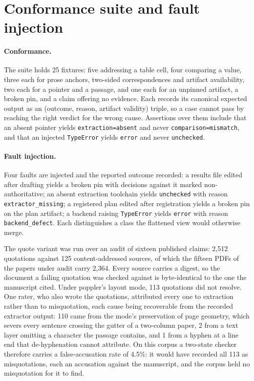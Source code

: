 \documentclass{article}
\newcommand{\code}[1]{\texttt{#1}}
\begin{document}
\section{Conformance suite and fault injection}
\label{sec:suite}

\paragraph{Conformance.}

The suite holds 25 fixtures: five addressing a table cell, four
comparing a value, three each for prose anchors, two-sided correspondences and artifact
availability, two each for a pointer and a passage, and one each for an unpinned artifact, a
broken pin, and a claim offering no evidence. Each records its canonical expected output as an
(outcome, reason, artifact validity) triple, so a case cannot pass by reaching the right verdict
for the wrong cause. Assertions over them include that an absent pointer yields
\code{extraction=absent} and never \code{comparison=mismatch}, and that an injected
\code{TypeError} yields \code{error} and never \code{unchecked}.

\paragraph{Fault injection.}

Four faults are injected and the reported outcome recorded: a results
file edited after drafting yields a broken pin with decisions against it marked non-authoritative;
an absent extraction toolchain yields \code{unchecked} with reason \code{extractor\_missing}; a
registered plan edited after registration yields a broken pin on the plan artifact; a backend
raising \code{TypeError} yields \code{error} with reason \code{backend\_defect}. Each distinguishes
a class the flattened view would otherwise merge.

The quote variant was run over an audit of sixteen published claims:
2{,}512 quotations against 125 content-addressed sources, of which the fifteen PDFs of the papers
under audit carry 2{,}364. Every source carries a digest, so the document a failing quotation was
checked against is byte-identical to the one the manuscript cited. Under poppler's layout mode,
113 quotations did not resolve. One rater, who also wrote the quotations, attributed every one to
extraction rather than to misquotation, each cause being recoverable from the recorded extractor
output: 110 came from the mode's preservation of page geometry, which severs every sentence
crossing the gutter of a two-column paper, 2 from a text layer omitting a character the passage contains, and 1 from a
hyphen at a line end that de-hyphenation cannot attribute. On this corpus a two-state checker therefore carries a false-accusation rate of 4.5\%: it would
have recorded all 113 as misquotations, each an accusation against the manuscript, and the corpus
held no misquotation for it to find.
\end{document}
